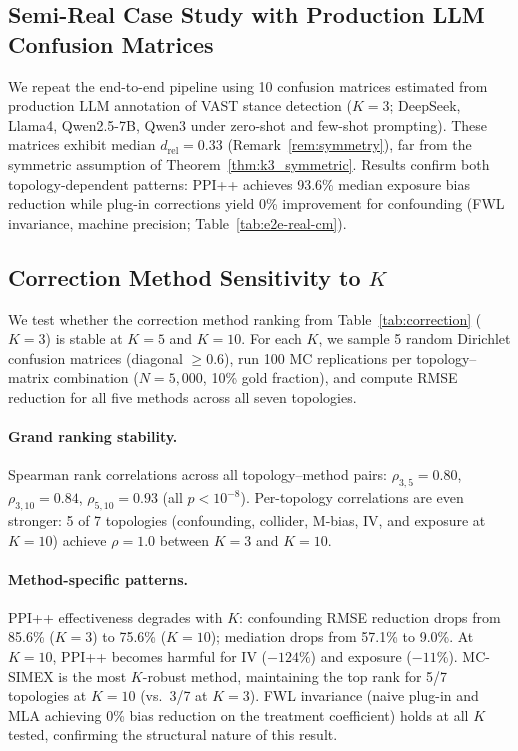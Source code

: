 \subsection{Semi-Real Case Study with Production LLM Confusion Matrices}
\label{sec:real_cm_demo}

We repeat the end-to-end pipeline using 10 confusion matrices estimated from production LLM annotation of VAST stance detection ($K{=}3$; DeepSeek, Llama4, Qwen2.5-7B, Qwen3 under zero-shot and few-shot prompting). These matrices exhibit median $d_{\mathrm{rel}}{=}0.33$ (Remark~\ref{rem:symmetry}), far from the symmetric assumption of Theorem~\ref{thm:k3_symmetric}. Results confirm both topology-dependent patterns: PPI++ achieves 93.6\% median exposure bias reduction while plug-in corrections yield 0\% improvement for confounding (FWL invariance, machine precision; Table~\ref{tab:e2e-real-cm}).



\subsection{Correction Method Sensitivity to $K$}
\label{sec:correction_k_sensitivity}

We test whether the correction method ranking from Table~\ref{tab:correction} ($K{=}3$) is stable at $K{=}5$ and $K{=}10$. For each $K$, we sample 5 random Dirichlet confusion matrices (diagonal $\geq 0.6$), run 100 MC replications per topology--matrix combination ($N{=}5{,}000$, 10\% gold fraction), and compute RMSE reduction for all five methods across all seven topologies.

\paragraph{Grand ranking stability.}
Spearman rank correlations across all topology--method pairs: $\rho_{3,5} = 0.80$, $\rho_{3,10} = 0.84$, $\rho_{5,10} = 0.93$ (all $p < 10^{-8}$). Per-topology correlations are even stronger: 5 of 7 topologies (confounding, collider, M-bias, IV, and exposure at $K{=}10$) achieve $\rho = 1.0$ between $K{=}3$ and $K{=}10$.

\paragraph{Method-specific patterns.}
PPI++ effectiveness degrades with $K$: confounding RMSE reduction drops from 85.6\% ($K{=}3$) to 75.6\% ($K{=}10$); mediation drops from 57.1\% to 9.0\%. At $K{=}10$, PPI++ becomes harmful for IV ($-124\%$) and exposure ($-11\%$). MC-SIMEX is the most $K$-robust method, maintaining the top rank for 5/7 topologies at $K{=}10$ (vs.\ 3/7 at $K{=}3$). FWL invariance (naive plug-in and MLA achieving 0\% bias reduction on the treatment coefficient) holds at all $K$ tested, confirming the structural nature of this result.

